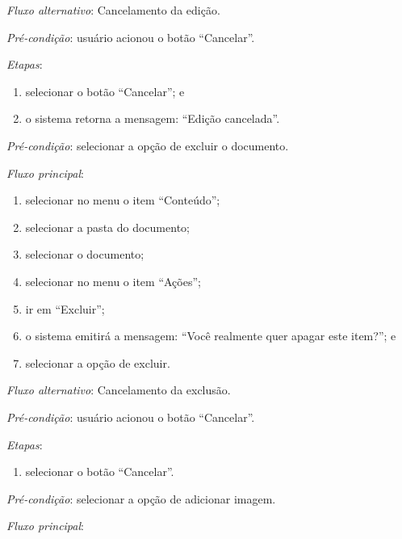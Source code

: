 \documentclass[a4paper,12pt]{article}
\begin{document}
\noindent \textit{Fluxo alternativo}: Cancelamento da edição.

\noindent \textit{Pré-condição}: usuário acionou o botão ``Cancelar''.

\noindent \textit{Etapas}:

\begin{enumerate}
    \item selecionar o botão ``Cancelar''; e
    \item o sistema retorna a mensagem: ``Edição cancelada''.
\end{enumerate}


\vspace{0.7cm}

\noindent \textit{Pré-condição}: selecionar a opção de excluir o documento.

\noindent \textit{Fluxo principal}:

\begin{enumerate}
    \item selecionar no menu o item ``Conteúdo'';
    \item selecionar a pasta do documento;
    \item selecionar o documento;
    \item selecionar no menu o item ``Ações'';
    \item ir em ``Excluir'';
    \item o sistema emitirá a mensagem: ``Você realmente quer apagar este item?''; e
    \item selecionar a opção de excluir.
\end{enumerate}

\noindent \textit{Fluxo alternativo}: Cancelamento da exclusão.

\noindent \textit{Pré-condição}: usuário acionou o botão ``Cancelar''.

\noindent \textit{Etapas}:

\begin{enumerate}
    \item selecionar o botão ``Cancelar''.
\end{enumerate}


\vspace{0.7cm}

\noindent \textit{Pré-condição}: selecionar a opção de adicionar imagem.

\noindent \textit{Fluxo principal}:
\end{document}
